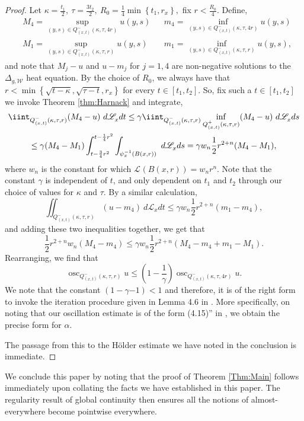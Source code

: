 \documentclass[AMS,STIX1COL]{WileyNJD-v2}
\numberwithin{equation}{section}
\renewcommand{\~}{\tilde}
\renewcommand{\-}{\bar}
\newcommand{\8}{\infty}
\newcommand{\cW}{\mathcal{W}}
\DeclareMathOperator{\osc}{osc}
\newcommand{\cbrac}[1]{\left(#1\right)}
\newcommand{\dbrac}[1]{\left\{#1\right\}}
\newcommand{\set}[1]{\dbrac{#1}}
\newcommand{\script}[1]{\mathscr{#1}}
\newcommand{\Leb}[1][{}]{\script{L}^{#1}}			%
\begin{document}
\begin{proof}
Let 
$\kappa = \frac{t_1}{2},\ \tau = \frac{3t_2}{2},\ R_0 = \frac{1}{4} \min\set{t_1, r_x},$ fix $r < \frac{R_0}{4}$.
Define, 
\begin{align*}
&M_4 = \sup_{(y,s) \in Q^{-}_{(x,t)}(\kappa, \tau, 4r)} u(y,s) &&m_4 = \inf_{(y,s) \in Q^{-}_{(x,t)}(\kappa, \tau, 4r)} u(y,s) \\
&M_1 = \sup_{(y,s) \in Q^{-}_{(x,t)}(\kappa, \tau, r)} u(y,s) &&m_1 = \inf_{(y,s) \in Q^{-}_{(x,t)}(\kappa, \tau, r)} u(y,s), 
\end{align*} 
and note that $M_j - u$ and $u - m_j$ for $j = 1, 4$ are non-negative
solutions to the $\Delta_{g,\cW}$ heat equation.
By the choice of $R_0$,
we always have that $r < \min\set{ \sqrt{t - \kappa}, \sqrt{\tau - t}, r_x}$
for every $t \in [t_1, t_2]$. 
So, fix such a $t \in [t_1, t_2]$ we invoke Theorem \ref{thm:Harnack} and integrate,
\begin{multline*}
\iint_{Q^-_{(x,t)}(\kappa,\tau,r)} (M_4 - u)\ d\Leb_x dt 
	\leq \gamma \iint_{Q^-_{(x,t)}(\kappa,\tau,r)} \inf_{Q^+_{(x,t)}(\kappa, \tau, r)} (M_4 - u)\ d\Leb_x ds \\
	\leq \gamma (M_4 - M_1) \int_{t- \frac{3}{4}r^2}^{t - \frac{1}{4}r^2} \int_{\psi_x^{-1}(B(x,r))}\ d\Leb_x ds
	= \gamma w_n  \frac{1}{2}r^{2+n} (M_4 - M_1),$$
\end{multline*}
where $w_n$ is the constant for which $\Leb(B(x,r)) = w_n r^n$.
Note that the constant $\gamma$ is independent of $t$, and only 
dependent on $t_1$ and $t_2$ through our choice
of values for $\kappa$ and $\tau$. 
By a similar calculation, 
$$
\iint_{Q^-_{(x,t)}(\kappa,\tau,r)} (u - m_4)\ d\Leb_x dt \leq \gamma w_n \frac{1}{2}r^{2+n} (m_1 - m_4),$$
and adding these two inequalities together, 
we get that
$$
\frac{1}{2}r^{2+n} w_n (M_4 - m_4) \leq \gamma w_n \frac{1}{2}r^{2+n} (M_4 - m_4 +m_1 - M_1).$$
Rearranging, we find that 
$$
\osc_{Q^{-}_{(x,t)}(\kappa, \tau, r)} u \leq \cbrac{1 - \frac{1}{\gamma}} \osc_{Q^{-}_{(x,t)}(\kappa, \tau, 4r)} u.$$
We note that the constant $(1 - \gamma{-1}) < 1$
and therefore, it is of the right form to invoke the iteration procedure given in Lemma 4.6 in \cite{Lieberman}.
More specifically, on noting that
our oscillation estimate is of the form (4.15)'' in \cite{Lieberman},
we obtain the precise form for $\alpha$.

The passage from this to the Hölder estimate
we have noted in the conclusion is immediate. 
\end{proof}

We conclude this paper by noting that the proof of Theorem \ref{Thm:Main}
follows immediately upon collating the facts we have established
in this paper. The regularity result of global continuity then ensures all the notions of almost-everywhere become pointwise everywhere.


\end{document}

